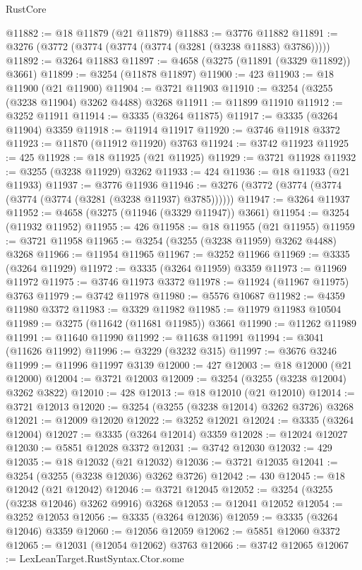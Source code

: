\begin{lexlean}{RustCore}
\begin{coremodule}
@11882 := @18 @11879 (@21 @11879)
@11883 := @3776 @11882
@11891 := @3276 (@3772 (@3774 (@3774 (@3774 (@3281 (@3238 @11883) @3786)))))
@11892 := @3264 @11883
@11897 := @4658 (@3275 (@11891 (@3329 @11892)) @3661)
@11899 := @3254 (@11878 @11897)
@11900 := 423
@11903 := @18 @11900 (@21 @11900)
@11904 := @3721 @11903
@11910 := @3254 (@3255 (@3238 @11904) @3262 @4488) @3268
@11911 := @11899 @11910
@11912 := @3252 @11911
@11914 := @3335 (@3264 @11875)
@11917 := @3335 (@3264 @11904) @3359
@11918 := @11914 @11917
@11920 := @3746 @11918 @3372
@11923 := @11870 (@11912 @11920) @3763
@11924 := @3742 @11923
@11925 := 425
@11928 := @18 @11925 (@21 @11925)
@11929 := @3721 @11928
@11932 := @3255 (@3238 @11929) @3262
@11933 := 424
@11936 := @18 @11933 (@21 @11933)
@11937 := @3776 @11936
@11946 := @3276 (@3772 (@3774 (@3774 (@3774 (@3774 (@3281 (@3238 @11937) @3785))))))
@11947 := @3264 @11937
@11952 := @4658 (@3275 (@11946 (@3329 @11947)) @3661)
@11954 := @3254 (@11932 @11952)
@11955 := 426
@11958 := @18 @11955 (@21 @11955)
@11959 := @3721 @11958
@11965 := @3254 (@3255 (@3238 @11959) @3262 @4488) @3268
@11966 := @11954 @11965
@11967 := @3252 @11966
@11969 := @3335 (@3264 @11929)
@11972 := @3335 (@3264 @11959) @3359
@11973 := @11969 @11972
@11975 := @3746 @11973 @3372
@11978 := @11924 (@11967 @11975) @3763
@11979 := @3742 @11978
@11980 := @5576 @10687
@11982 := @4359 @11980 @3372
@11983 := @3329 @11982
@11985 := @11979 @11983 @10504
@11989 := @3275 (@11642 (@11681 @11985)) @3661
@11990 := @11262 @11989
@11991 := @11640 @11990
@11992 := @11638 @11991
@11994 := @3041 (@11626 @11992)
@11996 := @3229 (@3232 @315)
@11997 := @3676 @3246
@11999 := @11996 @11997 @3139
@12000 := 427
@12003 := @18 @12000 (@21 @12000)
@12004 := @3721 @12003
@12009 := @3254 (@3255 (@3238 @12004) @3262 @3822)
@12010 := 428
@12013 := @18 @12010 (@21 @12010)
@12014 := @3721 @12013
@12020 := @3254 (@3255 (@3238 @12014) @3262 @3726) @3268
@12021 := @12009 @12020
@12022 := @3252 @12021
@12024 := @3335 (@3264 @12004)
@12027 := @3335 (@3264 @12014) @3359
@12028 := @12024 @12027
@12030 := @5851 @12028 @3372
@12031 := @3742 @12030
@12032 := 429
@12035 := @18 @12032 (@21 @12032)
@12036 := @3721 @12035
@12041 := @3254 (@3255 (@3238 @12036) @3262 @3726)
@12042 := 430
@12045 := @18 @12042 (@21 @12042)
@12046 := @3721 @12045
@12052 := @3254 (@3255 (@3238 @12046) @3262 @9916) @3268
@12053 := @12041 @12052
@12054 := @3252 @12053
@12056 := @3335 (@3264 @12036)
@12059 := @3335 (@3264 @12046) @3359
@12060 := @12056 @12059
@12062 := @5851 @12060 @3372
@12065 := @12031 (@12054 @12062) @3763
@12066 := @3742 @12065
@12067 := LexLeanTarget.RustSyntax.Ctor.some

\end{coremodule}
\end{lexlean}
